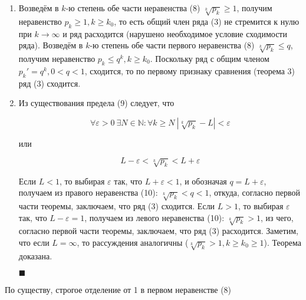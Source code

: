 \begin{enumerate}
	\item Возведём в $k$-ю степень обе части неравенства (8) $\sqrt[k]{p_k} \geqslant 1$, получим неравенство $p_k \geqslant 1, k \geqslant k_0$, то есть общий член ряда (3) не стремится к нулю при $k \rightarrow \infty$ и ряд расходится (нарушено необходимое условие сходимости ряда). Возведём в $k$-ю степень обе части первого неравенства (8) $\sqrt[k]{p_k} \leqslant q$, получим неравенство $p_k \leqslant q^k, k \geqslant k_0$. Поскольку ряд с общим членом $p_k' = q^k, 0 < q < 1$, сходится, то по первому признаку сравнения (теорема 3) ряд (3) сходится.
	
	\item Из существования предела (9) следует, что
	
	\begin{equation*}
		\forall\varepsilon > 0\ \exists N\in \mathbb{N}: \forall k \geqslant N\ |\sqrt[k]{p_k} - L| < \varepsilon
	\end{equation*}
	
	или
	
	\begin{equation}
		L - \varepsilon < \sqrt[k]{p_k} < L + \varepsilon
	\end{equation}
	
	Если $L < 1$, то выбирая $\varepsilon$ так, что $L + \varepsilon < 1$, и обозначая $q = L + \varepsilon$, получаем из правого неравенства (10): $\sqrt[k]{p_k} < q < 1$, откуда, согласно первой части теоремы, заключаем, что ряд (3) сходится. Если $L > 1$, то выбирая $\varepsilon$ так, что $L - \varepsilon = 1$, получаем из левого неравенства (10): $\sqrt[k]{p_k} > 1$, из чего, согласно первой части теоремы, заключаем, что ряд (3) расходится. Заметим, что если $L = \infty$, то рассуждения аналогичны ($\sqrt[k]{p_k} > 1, k \geqslant k_0 \geqslant 1$). Теорема доказана.
	\begin{flushright}
		$\blacksquare$
	\end{flushright}
\end{enumerate}

\begin{note}
	По существу, строгое отделение от 1 в первом неравенстве (8) 
\end{note}